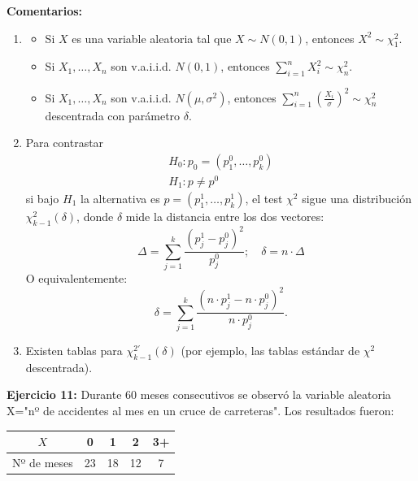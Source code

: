 \textbf{Comentarios:} %
\begin{enumerate}
    \item   \begin{itemize}
        \item Si $X$ es una variable aleatoria tal que $X \sim N(0,1)$, entonces $X^2 \sim \chi^2_1$.
        \item Si $X_1, \dots, X_n$ son v.a.i.i.d. $N(0,1)$, entonces $\sum_{i=1}^{n} X_i^2 \sim \chi^2_n$.
        \item Si $X_1, \dots, X_n$ son v.a.i.i.d. $N(\mu, \sigma^2)$, entonces 
        $
        \sum_{i=1}^{n} \left( \frac{X_i}{\sigma} \right)^2 \sim \chi^2_n
        $
        descentrada con parámetro $\delta$.
    \end{itemize}
    \item Para contrastar 
    \[
    \begin{matrix}
        H_0: p_0 = (p_1^0, \dots, p_k^0) \\
        H_1: p \neq p^0
    \end{matrix}
    \]
    si bajo $H_1$ la alternativa 
    es $p = (p_1^1, \dots, p_k^1)$, el test $\chi^2$ sigue 
    una distribución $\chi^2_{k-1}(\delta)$, donde $\delta$ 
    mide la distancia entre los dos vectores:
    \[
    \Delta = \sum_{j=1}^{k} \frac{(p_j^1 - p_j^0)^2}{p_j^0}; \quad \delta = n \cdot \Delta
    \]
    O equivalentemente:
    \[
    \delta = \sum_{j=1}^{k} \frac{\left( n \cdot p_j^1 - n \cdot p_j^0 \right)^2}{n \cdot p_j^0}.
    \]
    \item Existen tablas para $\chi_{k-1}^{2'}(\delta)$ (por ejemplo, las tablas estándar de $\chi^2$ descentrada).
\end{enumerate}

\textbf{Ejercicio 11:}  
Durante 60 meses consecutivos se observó la variable aleatoria X="nº de accidentes al mes en un cruce de carreteras". Los resultados fueron:

\begin{table}[!h]
    \centering
    \begin{tabular}{|c|c|c|c|c|}
        \hline
        {$X$} & 0 & 1 & 2 & 3+ \\ \hline
        {Nº de meses} & 23 & 18 & 12 & 7 \\ \hline
    \end{tabular}
\end{table}

